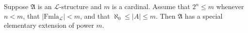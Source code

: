 Suppose $\mathfrak{A}$ is an $\mathcal{L}$-structure and $m$ is a cardinal. Assume that $2^n \leq m$ whenever $n < m$, that $|\text{Fmla}_{\mathcal{L}}| < m$, and that $\aleph_0 \leq |A| \leq m$. Then $\mathfrak{A}$ has a special elementary extension of power $m$.
